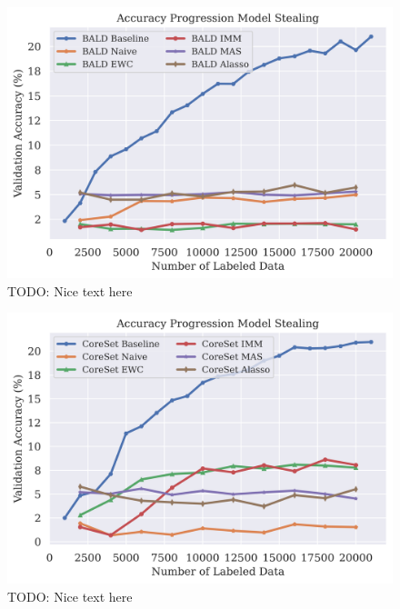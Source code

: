 \begin{figure}[h]
    \centering
    \includegraphics[width=0.8\linewidth]{images/results_CALMS/cifar100_label_bald.png}
    \caption[Accuracy Comparison for Model Stealing on CIFAR10 using the top1-label and the Active Learning strategy BALD]{TODO: Nice text here}
    \label{fig:CALMSCIFAR10LabelBALD}
\end{figure}

\begin{figure}[h]
    \centering
    \includegraphics[width=0.8\linewidth]{images/results_CALMS/cifar100_label_coreset.png}
    \caption[Accuracy Comparison for Model Stealing on CIFAR10 using the top1-label and the Active Learning strategy CoreSet]{TODO: Nice text here}
    \label{fig:CALMSCIFAR10LabelCoreSet}
\end{figure}

